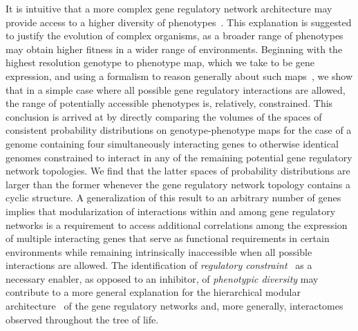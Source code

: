 It is intuitive that a more complex gene regulatory network architecture may provide access to a higher diversity of phenotypes~\cite{Adami2000,Carroll2001,Doebeli2010,Prochnik2010}. This explanation is suggested to justify the evolution of complex organisms, as a broader range of phenotypes may obtain higher fitness in a wider range of environments. Beginning with the highest resolution genotype to phenotype map, which we take to be gene expression, and using a formalism to reason generally about such maps~\cite{Lane1998,MacLane1992,Awodey2006,Abramsky2011}, we show that in a simple case where all possible gene regulatory interactions are allowed, the range of potentially accessible phenotypes is, relatively, constrained. This conclusion is arrived at by directly comparing the volumes of the spaces of consistent probability distributions on genotype-phenotype maps for the case of a genome containing four simultaneously interacting genes to otherwise identical genomes constrained to interact in any of the remaining potential gene regulatory network topologies. We find that the latter spaces of probability distributions are larger than the former whenever the gene regulatory network topology contains a cyclic structure. A generalization of this result to an arbitrary number of genes implies that modularization of interactions within and among gene regulatory networks is a requirement to access additional correlations among the expression of multiple interacting genes that serve as functional requirements in certain environments while remaining intrinsically inaccessible when all possible interactions are allowed. The identification of \emph{regulatory constraint}~\cite{Bar-Even2006,Johnson2010a} as a necessary enabler, as opposed to an inhibitor, of \emph{phenotypic diversity} may contribute to a more general explanation for the hierarchical modular architecture~\cite{Ravasz2002,Segre2005,Wagner2007,Erwin2009,Jothi2009,Bhardwaj2010,Colm} of the gene regulatory networks and, more generally, interactomes observed throughout the tree of life.
